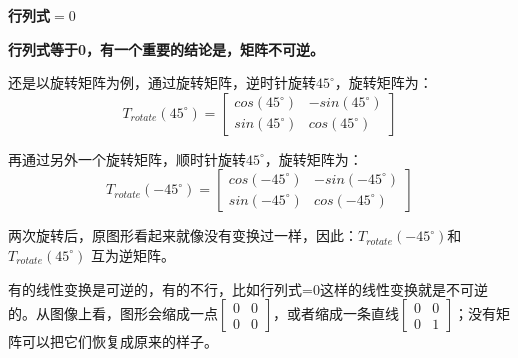 \documentclass[12pt]{article}
\begin{document}
\begin{framed}  
\textbf{行列式$=0$}

\textbf{行列式等于0，有一个重要的结论是，矩阵不可逆。}

还是以旋转矩阵为例，通过旋转矩阵，逆时针旋转$45^\circ$，旋转矩阵为：
$$
T_{rotate}(45^\circ)=\begin{bmatrix}cos(45^\circ)&-sin(45^\circ)\\sin(45^\circ)&cos(45^\circ)\end{bmatrix}
$$

再通过另外一个旋转矩阵，顺时针旋转$45^\circ$，旋转矩阵为：
$$
T_{rotate}(-45^\circ)=\begin{bmatrix}cos(-45^\circ)&-sin(-45^\circ)\\sin(-45^\circ)&cos(-45^\circ)\end{bmatrix}
$$

两次旋转后，原图形看起来就像没有变换过一样，因此：$T_{rotate}(-45^\circ)$和$T_{rotate}(45^\circ) $ 互为逆矩阵。

有的线性变换是可逆的，有的不行，比如行列式=0这样的线性变换就是不可逆的。从图像上看，图形会缩成一点$\begin{bmatrix}0&0\\0&0\end{bmatrix}$，或者缩成一条直线$\begin{bmatrix}0&0\\0&1\end{bmatrix}$；没有矩阵可以把它们恢复成原来的样子。
\end{framed}
\end{document}
